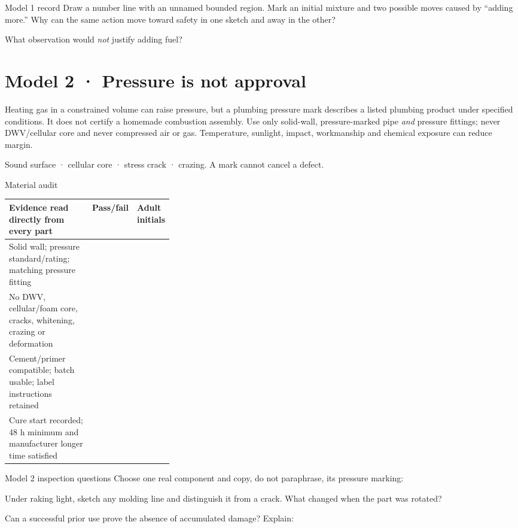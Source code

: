 \begin{teloscard}{Model 1 record}
Draw a number line with an unnamed bounded region. Mark an initial mixture and
two possible moves caused by ``adding more.'' Why can the same action move
toward safety in one sketch and away in the other?
\vspace{2.2em}

What observation would \emph{not} justify adding fuel? \hrulefill
\end{teloscard}

\section{Model 2 · Pressure is not approval}
Heating gas in a constrained volume can raise pressure, but a plumbing pressure
mark describes a listed plumbing product under specified conditions. It does
not certify a homemade combustion assembly. Use only solid-wall,
pressure-marked pipe \emph{and} pressure fittings; never DWV/cellular core and
never compressed air or gas. Temperature, sunlight, impact, workmanship and
chemical exposure can reduce margin.

{Sound surface · cellular core · stress crack · crazing. A mark cannot cancel a defect.}

\begin{teloscard}{Material audit}
\begin{tabularx}{\linewidth}{@{}L p{0.16\linewidth} p{0.16\linewidth}@{}}
\textbf{Evidence read directly from every part} & \textbf{Pass/fail} &
\textbf{Adult initials}\\ \midrule
Solid wall; pressure standard/rating; matching pressure fitting & &\\
No DWV, cellular/foam core, cracks, whitening, crazing or deformation & &\\
Cement/primer compatible; batch usable; label instructions retained & &\\
Cure start recorded; 48 h minimum and manufacturer longer time satisfied & &\\
\end{tabularx}
\end{teloscard}

\begin{teloscard}{Model 2 inspection questions}
Choose one real component and copy, do not paraphrase, its pressure marking:
\hrulefill

Under raking light, sketch any molding line and distinguish it from a crack.
What changed when the part was rotated? \hrulefill

Can a successful prior use prove the absence of accumulated damage? Explain:
\hrulefill
\end{teloscard}

